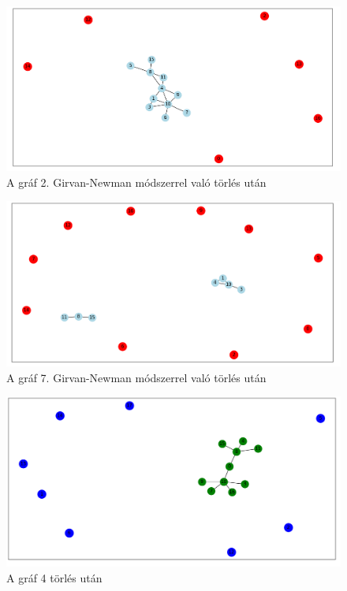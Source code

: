 \begin{figure}[h]
    \centering
    \includegraphics[scale=0.4]{images/girvan4lep}
    \caption{A gráf 2. Girvan-Newman módszerrel való törlés után }
    \label{fig:enter-label}
\end{figure}


\begin{figure}[h]
    \centering
    \includegraphics[scale=0.4]{images/girvan7lep}
    \caption{A gráf 7. Girvan-Newman módszerrel való törlés után}
    \label{fig:enter-label}
\end{figure}






\begin{figure}[h]
    \centering
    \includegraphics[scale=0.4]{images/suly5}
    \caption{A gráf 4 törlés után}
    \label{fig:enter-label}
\end{figure}



